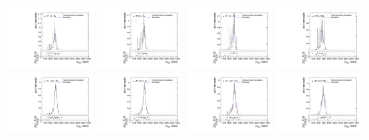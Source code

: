 \begin{figure}[htpb]
  \centering
  \includegraphics[width=0.2\textwidth]{fig/2Dfit/templateVsReco_WprToWZ2000_r0_MVV_mu_HP_bb_LDy_linear.pdf}
  \includegraphics[width=0.2\textwidth]{fig/2Dfit/templateVsReco_WprToWZ2000_r0_MVV_mu_LP_bb_LDy_linear.pdf}
  \includegraphics[width=0.2\textwidth]{fig/2Dfit/templateVsReco_WprToWZ2000_r0_MVV_mu_HP_bb_HDy_linear.pdf}
  \includegraphics[width=0.2\textwidth]{fig/2Dfit/templateVsReco_WprToWZ2000_r0_MVV_mu_LP_bb_HDy_linear.pdf}\\
  \includegraphics[width=0.2\textwidth]{fig/2Dfit/templateVsReco_WprToWZ2000_r0_MVV_mu_HP_nobb_LDy_linear.pdf}
  \includegraphics[width=0.2\textwidth]{fig/2Dfit/templateVsReco_WprToWZ2000_r0_MVV_mu_LP_nobb_LDy_linear.pdf}
  \includegraphics[width=0.2\textwidth]{fig/2Dfit/templateVsReco_WprToWZ2000_r0_MVV_mu_HP_nobb_HDy_linear.pdf}
  \includegraphics[width=0.2\textwidth]{fig/2Dfit/templateVsReco_WprToWZ2000_r0_MVV_mu_LP_nobb_HDy_linear.pdf}\\

\end{figure}
